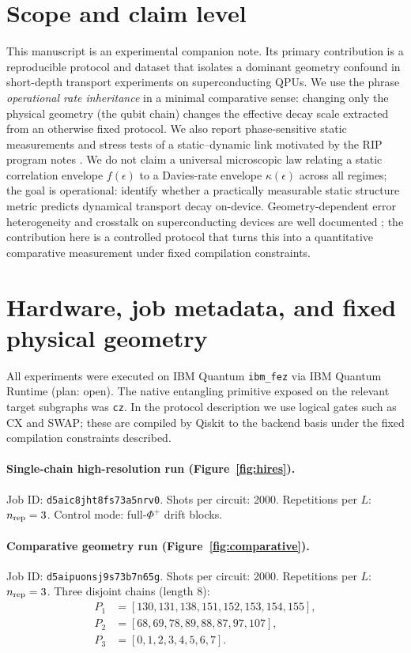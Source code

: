 \documentclass[11pt]{article}
\begin{document}
\section{Scope and claim level}
This manuscript is an experimental companion note. Its primary contribution
is a reproducible protocol and dataset that isolates a dominant geometry
confound in short-depth transport experiments on superconducting QPUs.
We use the phrase \emph{operational rate inheritance} in a minimal
comparative sense: changing only the physical geometry (the qubit chain)
changes the effective decay scale extracted from an otherwise fixed protocol.
We also report phase-sensitive static measurements and stress tests of a
static--dynamic link motivated by the RIP program notes \cite{RIP0072,RIP0070}.
We do not claim a universal microscopic law relating a static correlation
envelope $f(\epsilon)$ to a Davies-rate envelope $\kappa(\epsilon)$ across
all regimes; the goal is operational: identify whether a practically
measurable static structure metric predicts dynamical transport decay
on-device. Geometry-dependent error heterogeneity and crosstalk on
superconducting devices are well documented
\cite{Sarovar2020,Tripathi2022}; the contribution here is a controlled
protocol that turns this into a quantitative comparative measurement under
fixed compilation constraints.

\section{Hardware, job metadata, and fixed physical geometry}
All experiments were executed on IBM Quantum \texttt{ibm\_fez} via IBM
Quantum Runtime (plan: open). The native entangling primitive exposed on the
relevant target subgraphs was \texttt{cz}. In the protocol description we use
logical gates such as CX and SWAP; these are compiled by Qiskit
\cite{Qiskit} to the backend basis under the fixed compilation constraints
described.

\paragraph{Single-chain high-resolution run (Figure~\ref{fig:hires}).}
Job ID: \texttt{d5aic8jht8fs73a5nrv0}. Shots per circuit: 2000. Repetitions
per $L$: $n_{\rm rep}=3$. Control mode: full-$\Phi^+$ drift blocks.

\paragraph{Comparative geometry run (Figure~\ref{fig:comparative}).}
Job ID: \texttt{d5aipuonsj9s73b7n65g}. Shots per circuit: 2000. Repetitions
per $L$: $n_{\rm rep}=3$. Three disjoint chains (length 8):
\begin{align*}
P_1 &= [130, 131, 138, 151, 152, 153, 154, 155],\\
P_2 &= [68, 69, 78, 89, 88, 87, 97, 107],\\
P_3 &= [0, 1, 2, 3, 4, 5, 6, 7].
\end{align*}
\end{document}
